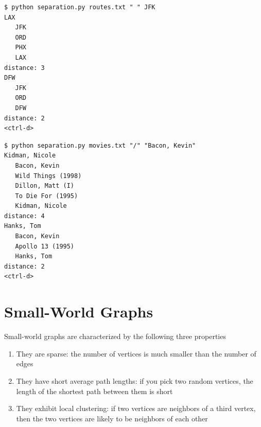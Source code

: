 \documentclass[8pt,a4paper,compress]{beamer}
\begin{document}
\begin{frame}[fragile]
\pause

\begin{lstlisting}[language={}]
$ python separation.py routes.txt " " JFK
LAX   
   JFK
   ORD
   PHX
   LAX
distance: 3
DFW
   JFK
   ORD
   DFW
distance: 2
<ctrl-d>
\end{lstlisting}

\pause

\begin{lstlisting}[language={}]
$ python separation.py movies.txt "/" "Bacon, Kevin"
Kidman, Nicole
   Bacon, Kevin
   Wild Things (1998)
   Dillon, Matt (I)
   To Die For (1995)
   Kidman, Nicole
distance: 4
Hanks, Tom
   Bacon, Kevin
   Apollo 13 (1995)
   Hanks, Tom
distance: 2
<ctrl-d>
\end{lstlisting}
\end{frame}

\section{Small-World Graphs}
\begin{frame}[fragile]
\pause

Small-world graphs are characterized by the following three properties

\begin{enumerate}
\item They are sparse: the number of vertices is much smaller than the number of edges

\item They have short average path lengths: if you pick two random vertices, the length of the shortest path between them is short

\item They exhibit local clustering: if two vertices are neighbors of a third vertex, then the two vertices are likely to be neighbors of each other
\end{enumerate}
\end{frame}
\end{document}
